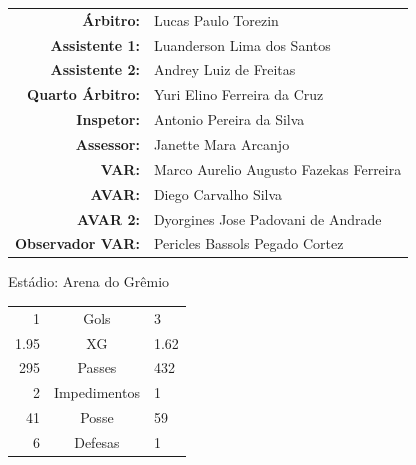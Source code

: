 \documentclass[11pt]{article}
\begin{document}
\vspace{0.5cm}
\begin{minipage}{0.65\textwidth}
\begin{center}
\begin{tabular}{rl}
\textbf{Árbitro:} & Lucas Paulo Torezin \\
\textbf{Assistente 1:} & Luanderson Lima dos Santos \\
\textbf{Assistente 2:} & Andrey Luiz de Freitas \\
\textbf{Quarto Árbitro:} & Yuri Elino Ferreira da Cruz \\
\textbf{Inspetor:} & Antonio Pereira da Silva \\
\textbf{Assessor:} & Janette Mara Arcanjo \\
\textbf{VAR:} & Marco Aurelio Augusto Fazekas Ferreira \\
\textbf{AVAR:} & Diego Carvalho Silva \\
\textbf{AVAR 2:} & Dyorgines Jose Padovani de Andrade \\
\textbf{Observador VAR:} & Pericles Bassols Pegado Cortez \\
\end{tabular}
\end{center}
\end{minipage}
\begin{minipage}{0.3\textwidth}
Estádio: Arena do Grêmio\\
\begin{tabular}{rcl}
1 & Gols & 3 \\
1.95 & XG & 1.62 \\
295 & Passes & 432 \\
2 & Impedimentos & 1 \\
41 & Posse & 59 \\
6 & Defesas & 1 \\
\end{tabular}
\end{minipage}
\newpage
\end{document}
